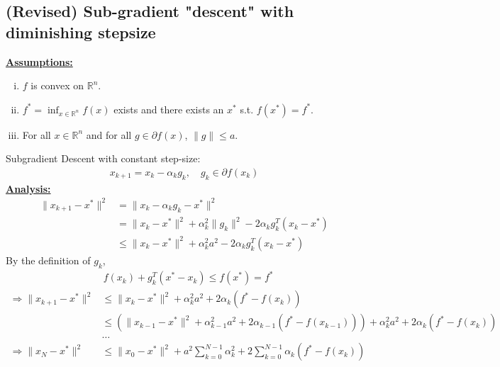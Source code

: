 \documentclass[11pt,a4paper]{article}
\begin{document}
\subsection{(Revised) Sub-gradient "descent" with diminishing stepsize}
\textbf{\underline{Assumptions:}}
\begin{enumerate}[(i)]
    \item $f$ is convex on $\mathbb{R}^n$.
    \item $f^*=\inf_{x\in \mathbb{R}^n}f(x)$ exists and there exists an $x^*$ s.t. $f(x^*)=f^*$.
    \item For all $x\in \mathbb{R}^n$ and for all $g\in \partial f(x)$, $\|g\|\leq a$.
\end{enumerate}
Subgradient Descent with constant step-size:
\begin{equation}
    \begin{aligned}
        x_{k+1}=x_k-\alpha_k g_k,\quad g_k\in \partial f(x_k)
    \end{aligned}
    \nonumber
\end{equation}
\textbf{\underline{Analysis:}}
\begin{equation}
    \begin{aligned}
        \|x_{k+1}-x^*\|^2&=\|x_k-\alpha_k g_k-x^*\|^2\\
        &=\|x_k-x^*\|^2+\alpha_k^2\|g_k\|^2-2\alpha_k g_k^T(x_k-x^*)\\
        &\leq \|x_k-x^*\|^2+\alpha_k^2a^2-2\alpha_k g_k^T(x_k-x^*)
    \end{aligned}
    \nonumber
\end{equation}
By the definition of $g_k$,
\begin{equation}
    \begin{aligned}
        &f(x_k)+g_k^T(x^*-x_k)\leq f(x^*)=f^*
    \end{aligned}
    \nonumber
\end{equation}
\begin{equation}
    \begin{aligned}
        \Rightarrow  \|x_{k+1}-x^*\|^2&\leq \|x_k-x^*\|^2+\alpha_k^2a^2+2\alpha_k (f^*-f(x_k))\\
        &\leq \left(\|x_{k-1}-x^*\|^2+\alpha_{k-1}^2a^2+2\alpha_{k-1}(f^*-f(x_{k-1}))\right)+\alpha_k^2a^2+2\alpha_k (f^*-f(x_k))\\
        &\dots\\
        \Rightarrow  \|x_{N}-x^*\|^2&\leq \|x_{0}-x^*\|^2+a^2\sum_{k=0}^{N-1}\alpha_{k}^2+2\sum_{k=0}^{N-1}\alpha_k(f^*-f(x_{k}))
    \end{aligned}
    \nonumber
\end{equation}
\end{document}
